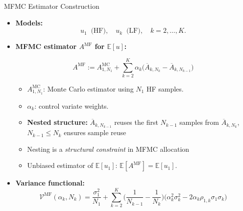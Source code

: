 \documentclass{beamer}
\begin{document}
\begin{frame}{MFMC Estimator Construction}

{\fontsize{10}{10}\selectfont
\begin{itemize}[leftmargin=5pt] 

    \item[$\triangleright$] \textcolor{myblue3}{\bf Models:} 
    \[
    u_1 \;\; \text{(HF)}, \quad u_k\;\; \text{(LF)},\quad  k=2,\dots,K.
    \]
    \item[$\triangleright$]\textcolor{myblue3}{\bf MFMC estimator $A^{\text{MF}}$ for $\mathbb{E}[u]$:} 
    
\[
\boxed{
A^{\text{MF}} := A^{\text{MC}}_{1,N_1} + \sum_{k=2}^K \alpha_k\big(\overline{A}_{k,N_k} - \overline{A}_{k,N_{k-1}}\big)
}
\]
\begin{itemize}[leftmargin=15pt] 
  \item[$\circ$] $A^{\text{MC}}_{1,N_1}$: Monte Carlo estimator using $N_1$ HF samples.
  \item[$\circ$] $\alpha_k$: control variate weights.
  \item[$\circ$] \textbf{Nested structure:}  $\overline{A}_{k,N_{k-1}}$ reuses the first $N_{k-1}$ samples from $\overline{A}_{k,N_{k}}$, $N_{k-1} \le N_k$ ensures sample reuse
\item Nesting is a \emph{structural constraint} in MFMC allocation
  \item[$\circ$] Unbiased estimator of $\mathbb{E}[u_1]$: $\mathbb{E}[A^{\text{MF}}] = \mathbb{E}[u_1]$.
\end{itemize}
\item[$\triangleright$] \textcolor{myblue3}{\bf Variance functional:} 
\[
\boxed{
\mathcal{V}^{\text{MF}}(\alpha_k, N_k)
    =\frac{\sigma_1^2}{N_1} 
    + \sum_{k=2}^K \!\Big(\frac{1}{N_{k-1}} - \frac{1}{N_k}\Big)\!
      \big(\alpha_k^2\sigma_k^2 - 2\alpha_k\rho_{1,k}\sigma_1\sigma_k\big)
}
\]
\end{itemize}
}
\end{frame}
\end{document}
